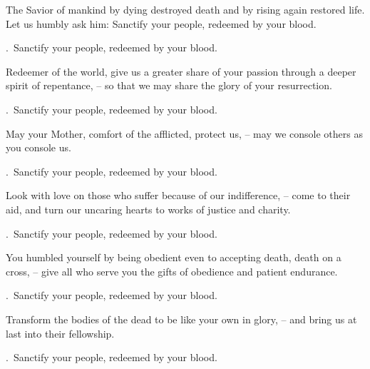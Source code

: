 \lettrine[loversize=0.15,lines=2]{T}{}he Savior of mankind by dying destroyed death and by rising again restored life. Let us humbly ask him: Sanctify your people, redeemed by your blood.
\par \Rbar.~Sanctify your people, redeemed by your blood.

Redeemer of the world, give us a greater share of your passion through a deeper spirit of repentance,
– so that we may share the glory of your resurrection.
\par \Rbar.~Sanctify your people, redeemed by your blood.

May your Mother, comfort of the afflicted, protect us,
– may we console others as you console us.
\par \Rbar.~Sanctify your people, redeemed by your blood.

Look with love on those who suffer because of our indifference,
– come to their aid, and turn our uncaring hearts to works of justice and charity.
\par \Rbar.~Sanctify your people, redeemed by your blood.

You humbled yourself by being obedient even to accepting death, death on a cross,
– give all who serve you the gifts of obedience and patient endurance.
\par \Rbar.~Sanctify your people, redeemed by your blood.

Transform the bodies of the dead to be like your own in glory,
– and bring us at last into their fellowship.
\par \Rbar.~Sanctify your people, redeemed by your blood.
